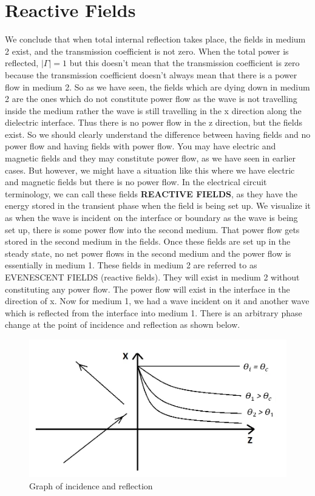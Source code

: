 \section{Reactive Fields}

We conclude that when total internal reflection takes place, the fields in medium 2 exist, and the transmission coefficient is not zero. When the total power is reflected, $|\Gamma| = 1$ but this doesn't mean that the transmission coefficient is zero because the transmission coefficient doesn't always mean that there is a power flow in medium 2. So as we have seen, the fields which are dying down in medium 2 are the ones which do not constitute power flow as the wave is not travelling inside the medium rather the wave is still travelling in the x direction along the dielectric interface. Thus there is no power flow in the z direction, but the fields exist. So we should clearly understand the difference between having fields and no power flow and having fields with power flow. You may have electric and magnetic fields and they may constitute power flow, as we have seen in earlier cases. But however, we might have a situation like this where we have electric and magnetic fields but there is no power flow. In the electrical circuit terminology, we can call these fields \textbf{ REACTIVE FIELDS}, as they have the energy stored in the transient phase when the field is being set up. We visualize it as when the wave is incident on the interface or boundary as the wave is being set up, there is some power flow into the second medium. That power flow gets stored in the second medium in the fields. Once these fields are set up in the steady state, no net power flows in the second medium and the power flow is essentially in medium 1. These fields in medium 2 are referred to as EVENESCENT FIELDS (reactive fields). They will exist in medium 2 without constituting any power flow. The power flow will exist in the interface in the direction of x. 
Now for medium 1, we had a wave incident on it and another wave which is reflected from the interface into medium 1. There is an arbitrary phase change at the point of incidence and reflection as shown below.
\begin{figure}[h]
\centering
\includegraphics[width=1\linewidth]{graphics/amplitude_decay2}
\caption{Graph of incidence and reflection}
\end{figure}

